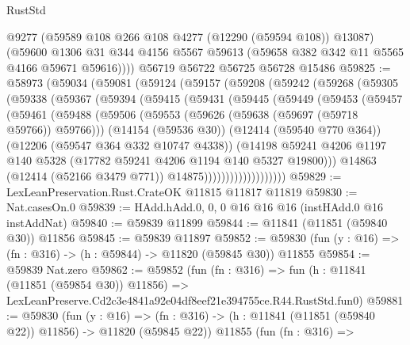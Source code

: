 \begin{lexlean}{RustStd}
\begin{coremodule}
        @9277
        (@59589 @108 @266 @108 @4277 (@12290 (@59594 @108)) @13087)
        (@59600
          @1306
          @31
          @344
          @4156
          @5567
          @59613
          (@59658 @382 @342 @11 @5565 @4166 @59671 @59616))))
    @56719
    @56722
    @56725
    @56728
    @15486
@59825 := @58973
    (@59034
      (@59081
        (@59124
          (@59157
            (@59208
              (@59242
                (@59268
                  (@59305
                    (@59338
                      (@59367
                        (@59394
                          (@59415
                            (@59431
                              (@59445
                                (@59449
                                  (@59453
                                    (@59457
                                      (@59461
                                        (@59488
                                          (@59506
                                            (@59553
                                              (@59626 (@59638 (@59697 (@59718 @59766)) @59766)))
                                            (@14154 (@59536 @30))
                                            (@12414 (@59540 @770 @364))
                                            (@12206 (@59547 @364 @332 @10747 @4338))
                                            (@14198
                                              @59241
                                              @4206
                                              @1197
                                              @140
                                              @5328
                                              (@17782 @59241 @4206 @1194 @140 @5327 @19800)))
                                          @14863
                                          (@12414 (@52166 @3479 @771))
                                          @14875)))))))))))))))))))
@59829 := LexLeanPreservation.Rust.CrateOK @11815 @11817 @11819
@59830 := Nat.casesOn.{0}
@59839 := HAdd.hAdd.{0, 0, 0} @16 @16 @16 (instHAdd.{0} @16 instAddNat)
@59840 := @59839 @11899
@59844 := @11841 (@11851 (@59840 @30)) @11856
@59845 := @59839 @11897
@59852 := @59830 (fun (y : @16) => (fn : @316) -> (h : @59844) -> @11820 (@59845 @30)) @11855
@59854 := @59839 Nat.zero
@59862 := @59852
    (fun (fn : @316) =>
    fun (h : @11841 (@11851 (@59854 @30)) @11856) =>
    LexLeanPreserve.Cd2c3e4841a92e04df8eef21e394755ce.R44.RustStd.fun0)
@59881 := @59830
    (fun (y : @16) =>
    (fn : @316) -> (h : @11841 (@11851 (@59840 @22)) @11856) -> @11820 (@59845 @22))
    @11855
    (fun (fn : @316) =>

\end{coremodule}
\end{lexlean}
